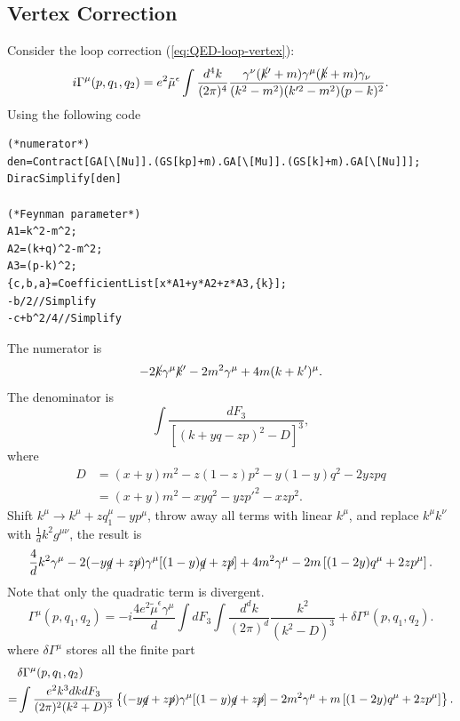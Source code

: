 \subsection{Vertex Correction}
Consider the loop correction (\ref{eq:QED-loop-vertex}):
\begin{equation}
	i \Gamma^\mu(p,q_1,q_2)
	= e^2\tilde{\mu}^{\epsilon} \int\frac{d^4 k}{(2\pi)^4} 
	\frac{\gamma^\nu(\cancel{k}'+m)\gamma^\mu (\cancel{k}+m)\gamma_\nu}{(k^2-m^2)(k'^2-m^2)(p-k)^2}.
\end{equation}
Using the following code
\begin{lstlisting}[style=mathematicaFrameTB]
(*numerator*)
den=Contract[GA[\[Nu]].(GS[kp]+m).GA[\[Mu]].(GS[k]+m).GA[\[Nu]]];
DiracSimplify[den]

(*Feynman parameter*)
A1=k^2-m^2;
A2=(k+q)^2-m^2;
A3=(p-k)^2;
{c,b,a}=CoefficientList[x*A1+y*A2+z*A3,{k}];
-b/2//Simplify
-c+b^2/4//Simplify
\end{lstlisting}
The numerator is
\begin{equation*}
	-2\cancel{k}\gamma^\mu\cancel{k}'-2m^2\gamma^\mu + 4m(k + k')^\mu.
\end{equation*}
The denominator is
\begin{equation*}
	\int \frac{dF_3}{[(k+yq-zp)^2-D]^3},
\end{equation*}
where 
\begin{equation*}
\begin{aligned}
	D &= (x+y)m^2 - z(1-z)p^2- y(1-y)q^2-2yzpq \\
	&=(x+y)m^2 - xy q^2- yz p'^2 - xz p^2.
\end{aligned}
\end{equation*}
Shift $k^\mu \rightarrow k^\mu + z q_1^\mu - y p^\mu$, throw away all terms with linear $k^\mu$, and replace $k^\mu k^\nu$ with $\frac{1}{d}k^2 g^{\mu\nu}$, the result is
\begin{equation*}
	\frac{4}{d}k^2\gamma^\mu  -2(-y \cancel{q}+z \cancel{p}) \gamma^{\mu}[(1-y) \cancel q+z \cancel p] +4 m^{2} \gamma^{\mu}-2 m\left[(1-2 y) q^{\mu}+2 z p^{\mu}\right].
\end{equation*}
Note that only the quadratic term is divergent. 
\begin{equation*}
	\Gamma^\mu(p,q_1,q_2) = -i\frac{4e^2\tilde{\mu}^{\epsilon} \gamma^\mu}{d}  \int dF_3 \int \frac{d^dk}{(2\pi)^d} \frac{k^2}{(k^2-D)^3} + \delta\Gamma^\mu(p,q_1,q_2).
\end{equation*}
where $\delta \Gamma^\mu$ stores all the finite part
\begin{equation*}
\begin{aligned}
	& \delta\Gamma^\mu(p,q_1,q_2) \\
	=& \int \frac{e^2 k^3 dk dF_3}{(2\pi)^2(k^2+D)^3} \left\{(-y \cancel{q}+z \cancel{p}) \gamma^{\mu}[(1-y) \cancel q+z \cancel p] -2 m^{2} \gamma^{\mu}+ m\left[(1-2 y) q^{\mu}+2 z p^{\mu}\right]\right\}.
\end{aligned}
\end{equation*}
